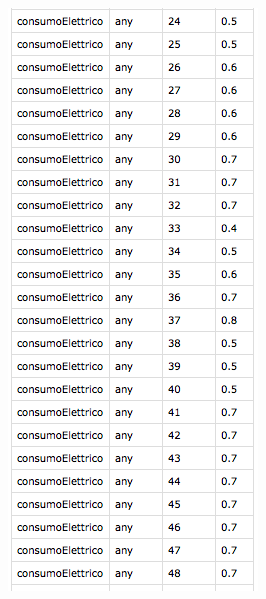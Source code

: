 \documentclass[12pt,a4paper,italian]{article}
\begin{document}
\begin{figure}[!h]
\begin{subfigure}{.3\textwidth}
	\end{subfigure}
	\begin{subfigure}{.3\textwidth}
		\centering
		\includegraphics[width=.8\linewidth]{img/profilo3.png}
	\end{subfigure}
	\begin{subfigure}{.3\textwidth}
		\centering

\end{subfigure}
\end{figure}
\end{document}
